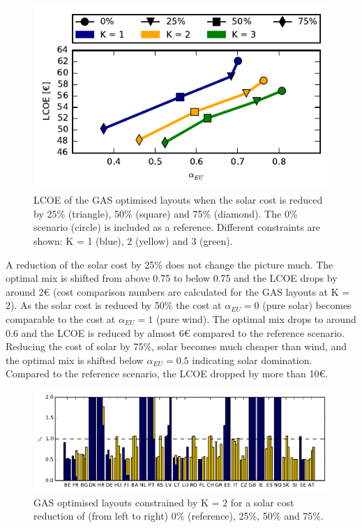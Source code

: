 \documentclass[a4paper, 5p, sort&compress]{elsarticle}%
\begin{document}
\begin{figure}[h!]
  \centering
  \includegraphics[width = \columnwidth]{solarAnalysis-new}
  \caption{LCOE of the GAS optimised layouts when the solar cost is
    reduced by 25\% (triangle), 50\% (square) and 75\% (diamond). The
    0\% scenario (circle) is included as a reference. Different
    constraints are shown: K = 1 (blue), 2 (yellow) and 3 (green).}
  \label{fig:red-solar}
\end{figure}

A reduction of the solar cost by 25\% does not change the picture
much. The optimal mix is shifted from above 0.75 to below 0.75 and the
LCOE drops by around 2\euro{}
(cost comparison numbers are calculated for the GAS layouts at K = 2).
As the solar cost is reduced by 50\% the cost at $\alpha_{EU} = 0$ (pure
solar) becomes comparable to the cost at $\alpha_{EU} = 1$ (pure wind). The
optimal mix drops to around 0.6 and the LCOE is reduced by almost
6\euro{}
compared to the reference scenario. Reducing the cost of solar by
75\%, solar becomes much cheaper than wind, and the optimal mix is
shifted below $\alpha_{EU} = 0.5$ indicating solar domination. Compared to
the reference scenario, the LCOE dropped by more than 10\euro.

\begin{figure}[t!]
  \centering
  \includegraphics[width = 2\columnwidth, center]{solarAnalysis-layouts}
  \caption{GAS optimised layouts constrained by K = 2 for a solar cost
    reduction of (from left to right) 0\% (reference), 25\%, 50\% and
    75\%.}
  \label{fig:layout-offshore}
\end{figure}
\end{document}
